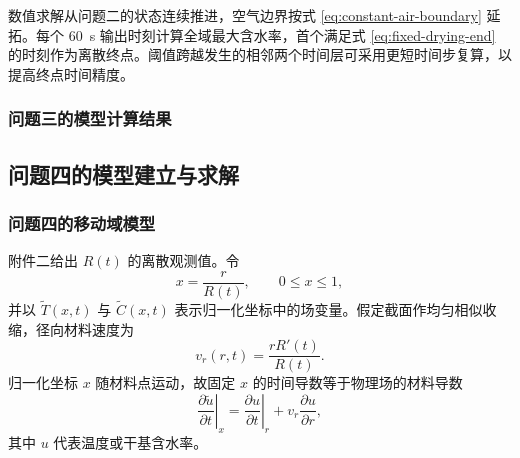 \documentclass[withoutpreface,bwprint]{cumcmthesis}
\begin{document}
数值求解从问题二的状态连续推进，空气边界按式 \ref{eq:constant-air-boundary} 延拓。每个 \SI{60}{s} 输出时刻计算全域最大含水率，首个满足式 \ref{eq:fixed-drying-end} 的时刻作为离散终点。阈值跨越发生的相邻两个时间层可采用更短时间步复算，以提高终点时间精度。

\subsubsection{问题三的模型计算结果}


\subsection{问题四的模型建立与求解}

\subsubsection{问题四的移动域模型}

附件二给出 \(R(t)\) 的离散观测值。令
\begin{equation}
x=\frac{r}{R(t)},\qquad 0\leq x\leq 1,
\label{eq:normalized-radius}
\end{equation}
并以 \(\widetilde{T}(x,t)\) 与 \(\widetilde{C}(x,t)\) 表示归一化坐标中的场变量。假定截面作均匀相似收缩，径向材料速度为
\begin{equation}
v_r(r,t)=\frac{rR'(t)}{R(t)}.
\label{eq:material-velocity}
\end{equation}
归一化坐标 \(x\) 随材料点运动，故固定 \(x\) 的时间导数等于物理场的材料导数
\begin{equation}
\left.\frac{\partial \widetilde{u}}{\partial t}\right|_{x}
=
\left.\frac{\partial u}{\partial t}\right|_{r}
+v_r\frac{\partial u}{\partial r},
\label{eq:material-derivative}
\end{equation}
其中 \(u\) 代表温度或干基含水率。
\end{document}
